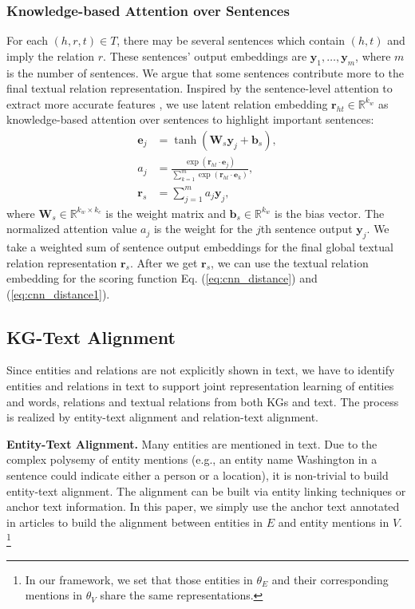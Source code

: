 \documentclass[11pt,a4paper]{article}
\begin{document}
\subsubsection{Knowledge-based Attention over Sentences}
For each $(h, r, t) \in T$, there may be several sentences which contain $(h, t)$ and imply the relation $r$. These sentences' output embeddings are ${\mathbf{y}_1, \ldots , \mathbf{y}_m}$, where $m$ is the number of sentences. We argue that some sentences contribute more to the final textual relation representation. Inspired by the sentence-level attention to extract more accurate features \cite{lin2016neural}, we use latent relation embedding $\mathbf{r}_{ht} \in \mathbb{R}^{k_w} $ as knowledge-based attention over sentences to highlight important sentences:
\begin{align}
\mathbf{e}_j & = \tanh(\mathbf{W}_s\mathbf{y}_j+\mathbf{b}_s), \\\nonumber
a_j & =\frac{\exp(\mathbf{r}_{ht}\cdot\mathbf{e}_j)}{\sum_{k = 1}^{m} \exp(\mathbf{r}_{ht}\cdot\mathbf{e}_k)}, \\\nonumber
\mathbf{r}_s & = \sum_{j = 1}^{m} a_j\mathbf{y}_j,
\end{align}
where $\mathbf{W}_s \in \mathbb{R}^{k_w \times k_c}$ is the weight matrix and $\mathbf{b}_s \in \mathbb{R}^{k_w}$ is the bias vector. The normalized attention value $a_j$ is the weight for the $j$th sentence output $\mathbf{y}_j$. We take a weighted sum of sentence output embeddings for the final global textual relation representation $\mathbf{r}_s$. After we get $\mathbf{r}_s$, we can use the textual relation embedding for the scoring function Eq. (\ref{eq:cnn_distance}) and (\ref{eq:cnn_distance1}).

\subsection{KG-Text Alignment}
\label{sec:alignment}

Since entities and relations are not explicitly shown in text, we have to identify entities and relations in text to support joint representation learning of entities and words, relations and textual relations from both KGs and text. The process is realized by entity-text alignment and relation-text alignment.

\textbf{Entity-Text Alignment.} Many entities are mentioned in text. Due to the complex polysemy of entity mentions (e.g., an entity name Washington in a sentence could indicate either a person or a location), it is non-trivial to build entity-text alignment. The alignment can be built via entity linking techniques or anchor text information. In this paper, we simply use the anchor text annotated in articles to build the alignment between entities in $E$ and entity mentions in $V$. \footnote{In our framework, we set that those entities in $\theta_E$ and their corresponding mentions in $\theta_V$ share the same representations.}
\end{document}
